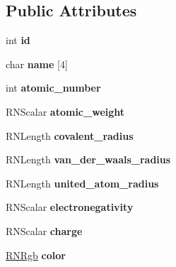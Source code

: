 \subsection*{Public Attributes}
\begin{DoxyCompactItemize}
\item 
int {\bfseries id}\hypertarget{class_p_d_b_element_a0dbe7e3384bbb22b9d51e504c80d79e8}{}\label{class_p_d_b_element_a0dbe7e3384bbb22b9d51e504c80d79e8}

\item 
char {\bfseries name} \mbox{[}4\mbox{]}\hypertarget{class_p_d_b_element_a3089b13281d2a644e8dda4b1babbfc66}{}\label{class_p_d_b_element_a3089b13281d2a644e8dda4b1babbfc66}

\item 
int {\bfseries atomic\+\_\+number}\hypertarget{class_p_d_b_element_a3f92d1af1c0da820bbffa66f0bafdfab}{}\label{class_p_d_b_element_a3f92d1af1c0da820bbffa66f0bafdfab}

\item 
R\+N\+Scalar {\bfseries atomic\+\_\+weight}\hypertarget{class_p_d_b_element_afa2e55bf937a250af959fa686ddd6f7d}{}\label{class_p_d_b_element_afa2e55bf937a250af959fa686ddd6f7d}

\item 
R\+N\+Length {\bfseries covalent\+\_\+radius}\hypertarget{class_p_d_b_element_ac057e47b3c3c0fb5f9dfa55b896109b2}{}\label{class_p_d_b_element_ac057e47b3c3c0fb5f9dfa55b896109b2}

\item 
R\+N\+Length {\bfseries van\+\_\+der\+\_\+waals\+\_\+radius}\hypertarget{class_p_d_b_element_acae04d5f4d5cc10aaac7c7f852ca0430}{}\label{class_p_d_b_element_acae04d5f4d5cc10aaac7c7f852ca0430}

\item 
R\+N\+Length {\bfseries united\+\_\+atom\+\_\+radius}\hypertarget{class_p_d_b_element_afef97b5c099e4de4ef2e97f083bbd76a}{}\label{class_p_d_b_element_afef97b5c099e4de4ef2e97f083bbd76a}

\item 
R\+N\+Scalar {\bfseries electronegativity}\hypertarget{class_p_d_b_element_a7cfe205147978ffa7a6f49051b0af9bf}{}\label{class_p_d_b_element_a7cfe205147978ffa7a6f49051b0af9bf}

\item 
R\+N\+Scalar {\bfseries charge}\hypertarget{class_p_d_b_element_a7584aaa052e554f2a6b11ca6dffae3f7}{}\label{class_p_d_b_element_a7584aaa052e554f2a6b11ca6dffae3f7}

\item 
\hyperlink{class_r_n_rgb}{R\+N\+Rgb} {\bfseries color}\hypertarget{class_p_d_b_element_ae06bc9f2e7fa20753e454be46c6b57d9}{}\label{class_p_d_b_element_ae06bc9f2e7fa20753e454be46c6b57d9}


\end{DoxyCompactItemize}

